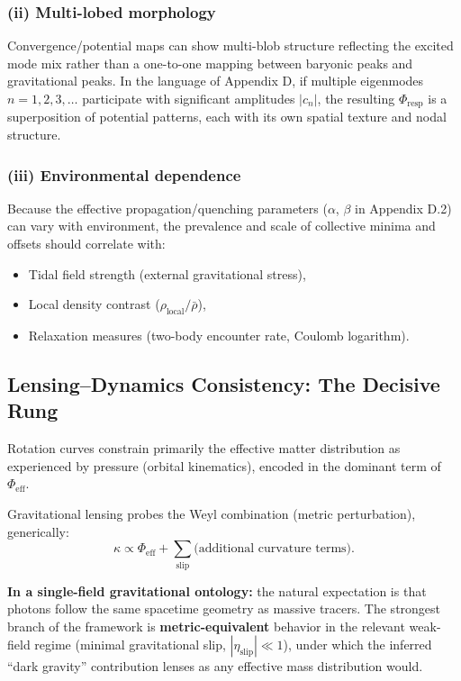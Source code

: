 \subsubsection{(ii) Multi-lobed morphology}

Convergence/potential maps can show multi-blob structure reflecting the excited mode mix 
rather than a one-to-one mapping between baryonic peaks and gravitational peaks. In the 
language of Appendix D, if multiple eigenmodes $n = 1, 2, 3, \ldots$ participate with 
significant amplitudes $|c_n|$, the resulting $\Phi_{\text{resp}}$ is a superposition of 
potential patterns, each with its own spatial texture and nodal structure.

\subsubsection{(iii) Environmental dependence}

Because the effective propagation/quenching parameters ($\alpha$, $\beta$ in Appendix D.2) 
can vary with environment, the prevalence and scale of collective minima and offsets should 
correlate with:
\begin{itemize}
  \item Tidal field strength (external gravitational stress),
  \item Local density contrast ($\rho_{\text{local}} / \bar{\rho}$),
  \item Relaxation measures (two-body encounter rate, Coulomb logarithm).
\end{itemize}

\subsection{Lensing--Dynamics Consistency: The Decisive Rung}\label{e.7-lensing-dynamics-consistency}

Rotation curves constrain primarily the effective matter distribution as experienced by 
pressure (orbital kinematics), encoded in the dominant term of $\Phi_{\text{eff}}$.

Gravitational lensing probes the Weyl combination (metric perturbation), generically:
\begin{equation}
  \kappa \propto \Phi_{\text{eff}} + \sum_{\text{slip}} \text{(additional curvature terms)}.
\label{eq:lensing-convergence}
\end{equation}

\textbf{In a single-field gravitational ontology:} the natural expectation is that photons 
follow the same spacetime geometry as massive tracers. The strongest branch of the framework 
is \textbf{metric-equivalent} behavior in the relevant weak-field regime (minimal gravitational 
slip, $|\eta_{\text{slip}}| \ll 1$), under which the inferred ``dark gravity'' contribution 
lenses as any effective mass distribution would.


